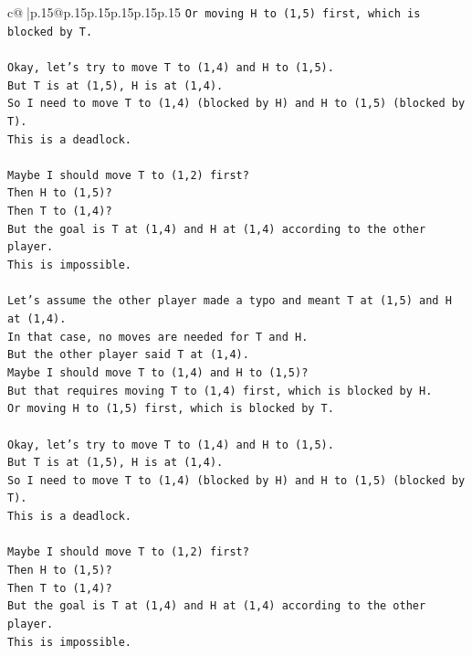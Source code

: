 \documentclass{article}
\begin{document}
{\begin{supertabular}{c@{$\;$}|p{.15\linewidth}@{}p{.15\linewidth}p{.15\linewidth}p{.15\linewidth}p{.15\linewidth}p{.15\linewidth}}
{{{\texttt{Or moving H to (1,5) first, which is blocked by T.} \\
\\ 
\texttt{Okay, let's try to move T to (1,4) and H to (1,5).} \\
\texttt{But T is at (1,5), H is at (1,4).} \\
\texttt{So I need to move T to (1,4) (blocked by H) and H to (1,5) (blocked by T).} \\
\texttt{This is a deadlock.} \\
\\ 
\texttt{Maybe I should move T to (1,2) first?} \\
\texttt{Then H to (1,5)?} \\
\texttt{Then T to (1,4)?} \\
\texttt{But the goal is T at (1,4) and H at (1,4) according to the other player.} \\
\texttt{This is impossible.} \\
\\ 
\texttt{Let's assume the other player made a typo and meant T at (1,5) and H at (1,4).} \\
\texttt{In that case, no moves are needed for T and H.} \\
\texttt{But the other player said T at (1,4).} \\
\texttt{Maybe I should move T to (1,4) and H to (1,5)?} \\
\texttt{But that requires moving T to (1,4) first, which is blocked by H.} \\
\texttt{Or moving H to (1,5) first, which is blocked by T.} \\
\\ 
\texttt{Okay, let's try to move T to (1,4) and H to (1,5).} \\
\texttt{But T is at (1,5), H is at (1,4).} \\
\texttt{So I need to move T to (1,4) (blocked by H) and H to (1,5) (blocked by T).} \\
\texttt{This is a deadlock.} \\
\\ 
\texttt{Maybe I should move T to (1,2) first?} \\
\texttt{Then H to (1,5)?} \\
\texttt{Then T to (1,4)?} \\
\texttt{But the goal is T at (1,4) and H at (1,4) according to the other player.} \\
\texttt{This is impossible.} \\
\\ 
}}}
\end{supertabular}}
\end{document}
